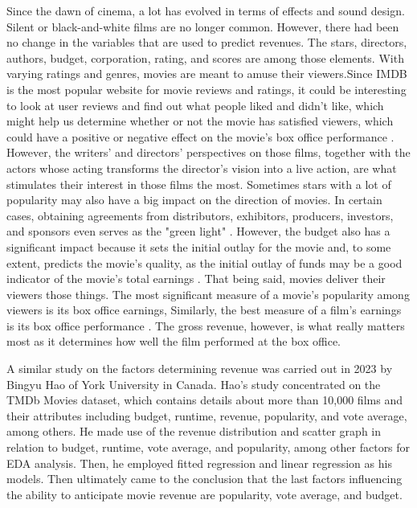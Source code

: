 \documentclass[12pt]{article}
\begin{document}
Since the dawn of cinema, a lot has evolved in terms of effects and sound design. 
Silent or black-and-white films are no longer common. However, there had been no
change in the variables that are used to predict revenues. The stars, directors,
authors, budget, corporation, rating, and scores are among those elements. With 
varying ratings and genres, movies are meant to amuse their viewers.Since IMDB is the
most popular website for movie reviews and ratings, it could be interesting to look at 
user reviews and find out what people liked and didn't like, which might help us determine
whether or not the movie has satisfied viewers, which could have a positive or negative 
effect on the movie's box office performance \citep{3}. However, the writers' and directors' perspectives on
those films, together with the actors whose acting transforms the director's vision 
into a live action, are what stimulates their interest in those films the most. Sometimes
stars with a lot of popularity may also have a big impact on the direction of movies. In certain cases,
obtaining agreements from distributors, exhibitors, producers, investors, and sponsors 
even serves as the "green light" \citep{1}. However, the budget also has a significant 
impact because it sets the initial outlay for the movie and, to some extent, predicts the movie's
quality, as the initial outlay of funds may be a good indicator of the movie's total earnings \citep{2}. 
That being said, movies deliver their viewers those things. The most significant measure of a movie's popularity among viewers
is its box office earnings, Similarly, the best measure of a film's earnings is its box office performance \citep{2}.
The gross revenue, however, is what really matters most as it determines how well the film performed at the box office.

A similar study on the factors determining revenue was carried out in 2023 by Bingyu Hao 
of York University in Canada. Hao's study concentrated on the TMDb Movies dataset, which 
contains details about more than 10,000 films and their attributes including budget, runtime, 
revenue, popularity, and vote average, among others. He made use of the revenue distribution 
and scatter graph in relation to budget, runtime, vote average, and popularity, among other 
factors for EDA analysis. Then, he employed fitted regression and linear regression as his models. Then ultimately
came to the conclusion that the last factors influencing the ability to anticipate movie revenue 
are popularity, vote average, and budget.
\end{document}
